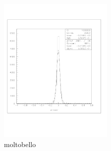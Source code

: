 \documentclass[a4paper]{article}
\begin{document}
\begin{figure}[!htb]
  \includegraphics[width=0.49\textwidth]{ex_images/1_020_140_xse.jpg}
  \caption{moltobello}
  \label{fig:020_xse}
\end{figure}
\end{document}

